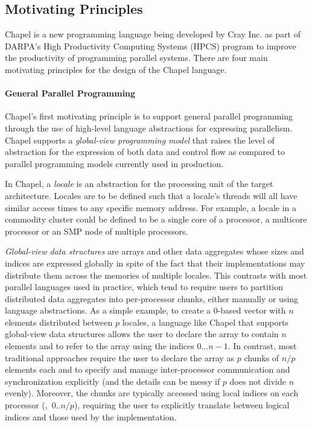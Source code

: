 \label{Language_Overview}

\subsection{Motivating Principles}

Chapel is a new programming language being developed by
Cray Inc. as part of DARPA's High Productivity Computing Systems 
(HPCS) program to improve the productivity
of programming parallel systems.  There are four main motivating
principles for the design of the Chapel language.

\paragraph{General Parallel Programming}

Chapel's first motivating principle is to support general parallel
programming through the use of high-level language abstractions
for expressing parallelism.  Chapel supports a 
\emph{global-view programming model} that raises the level of
abstraction for the expression of both data and control flow as
compared to parallel programming models currently used in production.

In Chapel, a \emph{locale} is an abstraction for the processing
unit of the target architecture.  Locales are to be defined such that
a locale's threads will all have similar access times to any
specific memory address.  For example, a locale in a commodity cluster 
could be defined to be a single core of a processor, a multicore
processor or an SMP node of multiple processors.

\emph{Global-view data structures} are arrays and other data
aggregates whose sizes and indices are expressed globally in spite of
the fact that their implementations may distribute them across the
memories of multiple locales.  This
contrasts with most parallel languages used in practice, which tend to
require users to partition distributed data aggregates into
per-processor chunks, either manually or using language abstractions.
As a simple example, to create a 0-based vector with $n$ elements
distributed between $p$ locales, a language like Chapel that supports
global-view data structures allows the user to declare the array to
contain $n$ elements and to refer to the array using the indices $0
\ldots n-1$.  In contrast, most traditional approaches require the
user to declare the array as $p$ chunks of $n/p$ elements each and to
specify and manage inter-processor communication and synchronization
explicitly (and the details can be messy if $p$ does not divide $n$
evenly).  Moreover, the chunks are typically accessed using local
indices on each processor (\eg,~$0..n/p$), requiring the user to
explicitly translate between logical indices and those used by the
implementation.

